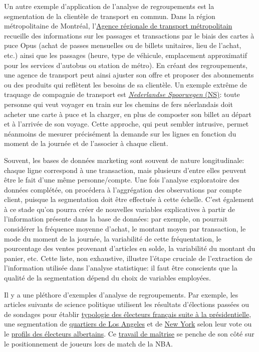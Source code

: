 \documentclass[
  11pt,
  letterpaper,
]{scrbook}
\theoremstyle{definition}
\theoremstyle{remark}
\begin{document}
Un autre exemple d'application de l'analyse de regroupements est la
segmentation de la clientèle de transport en commun. Dans la région
métropolitaine de Montréal, l'\href{https://www.artm.quebec/}{Agence
régionale de transport métropolitain} recueille des informations sur les
passages et transactions par le biais des cartes à puce Opus (achat de
passes mensuelles ou de billets unitaires, lieu de l'achat, etc.) ainsi
que les passages (heure, type de véhicule, emplacement approximatif pour
les services d'autobus ou station de métro). En créant des
regroupements, une agence de transport peut ainsi ajuster son offre et
proposer des abonnements ou des produits qui reflètent les besoins de sa
clientèle. Un exemple extrême de traquage de compagnie de transport est
\href{https://www.ns.nl/en/}{\emph{Nederlandse Spoorwegen} (NS)}: toute
personne qui veut voyager en train sur les chemins de fers néerlandais
doit acheter une carte à puce et la charger, en plus de composter son
billet au départ et à l'arrivée de son voyage. Cette approche, qui peut
sembler intrusive, permet néanmoins de mesurer précisément la demande
sur les lignes en fonction du moment de la journée et de l'associer à
chaque client.

Souvent, les bases de données marketing sont souvent de nature
longitudinale: chaque ligne correspond à une transaction, mais plusieurs
d'entre elles peuvent être le fait d'une même personne/compte. Une fois
l'analyse exploratoire des données complétée, on procédera à
l'aggrégation des observations par compte client, puisque la
segmentation doit être effectuée à cette échelle. C'est également à ce
stade qu'on pourra créer de nouvelles variables explicatives à partir de
l'information présente dans la base de données: par exemple, on pourrait
considérer la fréquence moyenne d'achat, le montant moyen par
transaction, le mode du moment de la journée, la variabilité de cette
fréquentation, le pourcentage des ventes provenant d'articles en solde,
la variabilité du montant du panier, etc. Cette liste, non exhaustive,
illustre l'étape cruciale de l'extraction de l'information utilisée dans
l'analyse statistique: il faut être conscients que la qualité de la
segmentation dépend du choix de variables employées.

Il y a une pléthore d'exemples d'analyse de regroupements. Par exemple,
les articles suivants de science politique utilisent les résultats
d'élections passées ou de sondages pour établir
\href{https://cybergeo.hypotheses.org/1199}{typologie des électeurs
français suite à la présidentielle}, une segmentation de
\href{https://fivethirtyeight.com/features/the-6-political-neighborhoods-of-los-angeles/}{quartiers
de Los Angeles} et de
\href{https://fivethirtyeight.com/features/the-5-political-boroughs-of-new-york-city/}{New
York} selon leur vote ou le
\href{https://www.cbc.ca/news/canada/calgary/danielle-smith-alberta-moderate-middle-ucp-ndp-poll-1.6651460}{profils
des électeurs albertains}. Ce
\href{https://github.com/nedwardsthro/Thesis_Work}{travail de maîtrise}
se penche de son côté sur le positionnement de joueurs lors de match de
la NBA.
\end{document}
